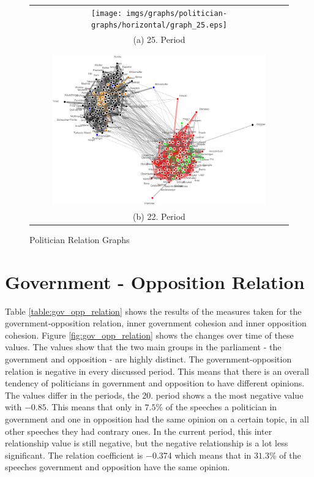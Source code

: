 \begin{figure}
\center
\begin{tabular}{ c }
	\texttt{[image: imgs/graphs/politician-graphs/horizontal/graph\_25.eps]}
	\\
	(a) 25. Period
	\\
	\\
	\hline
	\\
	
	\includegraphics[width=0.85\textwidth]{imgs/graphs/politician-graphs/horizontal/graph_22.eps}
	\\
	(b) 22. Period
\end{tabular}
	
	
	\caption{Politician Relation Graphs}
	\label{fig:pol_graphs1}
\end{figure}

\section{Government - Opposition Relation}
\label{sec:gov_opp_relation}
Table \ref{table:gov_opp_relation} shows the results of the measures taken for the government-opposition relation, inner government cohesion and inner opposition cohesion. Figure \ref{fig:gov_opp_relation} shows the changes over time of these values. The values show that the two main groups in the parliament - the government and opposition - are highly distinct. The government-opposition relation is negative in every discussed period. This means that there is an overall tendency of politicians in government and opposition to have different opinions. The values differ in the periods, the 20. period shows a the most negative value with $-0.85$. This means that only in $7.5$\% of the speeches a politician in government and one in opposition had the same opinion on a certain topic, in all other speeches they had contrary ones. In the current period, this inter relationship value is still negative, but the negative relationship is a lot less significant. The relation coefficient is $-0.374$ which means that in $31.3$\% of the speeches government and opposition have the same opinion.

